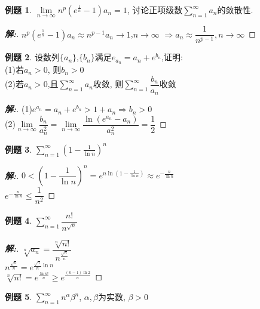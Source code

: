 \documentclass[12pt,a4paper]{ctexart}
\newenvironment{solution}{\begin{proof}[\hspace{2em}\textbf{解:}]}{\end{proof}}
\theoremstyle{definition}%
\newtheorem{exercise}{\hspace{2em}例题}
\begin{document}
\begin{exercise}
	$ \lim\limits_{n \to \infty} n^p(e^{\frac{1}{n}}-1)a_n=1 $,
	讨论正项级数$ \displaystyle\sum_{n=1}^{\infty}a_n $的敛散性.
\end{exercise}
\begin{solution}
	$ n^p(e^{\frac{1}{n}}-1)a_n
	\approx n^{p-1}a_n
	\to 1 $,$ n \to \infty $
	$ \Rightarrow a_n \approx \dfrac{1}{n^{p-1}},n \to \infty $
\end{solution}
\begin{exercise}
	设数列$ \{a_n\} $,$ \{b_n\} $满足$ e_{a_n}=a_n+e^{b_n} $,证明:\\
	
	(1)若$ a_n>0 $, 则$ b_n>0 $\\
	
	(2)若$ a_n>0 $,且$ \displaystyle\sum_{n=1}^{\infty}a_n $收敛, 则$ \displaystyle\sum_{n=1}^{\infty}\dfrac{b_n}{a_n} $收敛
\end{exercise}
\begin{solution}
	(1)$ e^{a_n}=a_n+e^{b_n}>1+a_n \Rightarrow b_n>0 $\\
	
	(2)$ \lim\limits_{n \to \infty}\dfrac{b_n}{a_n^2}
	=\lim\limits_{n \to \infty} \dfrac{\ln(e^{a_n}-a_n)}{a_n^2}
	=\dfrac{1}{2} $
\end{solution}
\begin{exercise}
	$ \displaystyle\sum_{n=1}^{\infty}(1-\frac{1}{\ln n})^n $
\end{exercise}
\begin{solution}
	$ 0<(1-\dfrac{1}{\ln n})^n
	=e^{n \ln (1-\tfrac{1}{\ln n})}
	\approx e^{-\tfrac{n}{\ln n}} $\\
	$  e^{-\tfrac{n}{\ln n}} \le \dfrac{1}{n^2} $
\end{solution}
\begin{exercise}
	$ \displaystyle\sum_{n=1}^{\infty}\dfrac{n!}{n^{\sqrt{n}}} $
\end{exercise}
\begin{solution}
	$ \displaystyle\sqrt[n]{a_n}=\dfrac{\sqrt[n]{n!}}{n^{\frac{\sqrt{n}}{n}}} $\\
	
	$ \displaystyle n^{\frac{\sqrt{n}}{n}}
	=e^{\tfrac{\sqrt{n}}{n}\ln n} $\\
	
	$ \sqrt[n]{n!}=e^{\tfrac{\ln n!}{n}}
	\ge e^{\tfrac{(n-1)\ln 2}{n}} $
\end{solution}
\begin{exercise}
	$ \displaystyle\sum_{n=1}^{\infty}n^\alpha \beta^n $, $ \alpha,\beta $为实数, $ \beta>0 $
\end{exercise}
\end{document}
